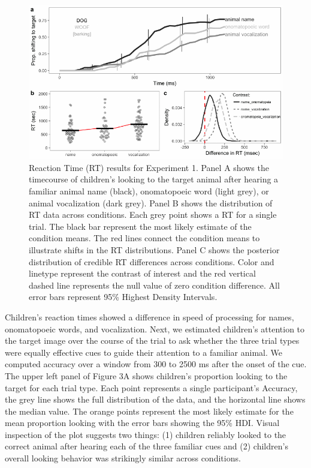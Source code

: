\documentclass[english,floatsintext,man]{apa6}
\theoremstyle{definition}
\theoremstyle{definition}
\theoremstyle{definition}
\theoremstyle{remark}
\begin{document}
\begin{figure}[t]

{\centering \includegraphics[width=0.8\linewidth]{anime_manuscript_files/figure-latex/oc-plot-e1-1} 

}

\caption{Reaction Time (RT) results for Experiment 1. Panel A shows the timecourse of children’s looking to the target animal after hearing a familiar animal name (black), onomatopoeic word (light grey), or animal vocalization (dark grey). Panel B shows the distribution of RT data across conditions. Each grey point shows a RT for a single trial. The black bar represent the most likely estimate of the condition means. The red lines connect the condition means to illustrate shifts in the RT distributions. Panel C shows the posterior distribution of credible RT differences across conditions. Color and linetype represent the contrast of interest and the red vertical dashed line represents the null value of zero condition difference. All error bars represent 95\% Highest Density Intervals.}\label{fig:oc-plot-e1}
\end{figure}

Children's reaction times showed a difference in speed of processing for
names, onomatopoeic words, and vocalization. Next, we estimated
children's attention to the target image over the course of the trial to
ask whether the three trial types were equally effective cues to guide
their attention to a familiar animal. We computed accuracy over a window
from 300 to 2500 ms after the onset of the cue. The upper left panel of
Figure 3A shows children's proportion looking to the target for each
trial type. Each point represents a single participant's Accuracy, the
grey line shows the full distribution of the data, and the horizontal
line shows the median value. The orange points represent the most likely
estimate for the mean proportion looking with the error bars showing the
95\% HDI. Visual inspection of the plot suggests two things: (1)
children reliably looked to the correct animal after hearing each of the
three familiar cues and (2) children's overall looking behavior was
strikingly similar across conditions.
\end{document}
